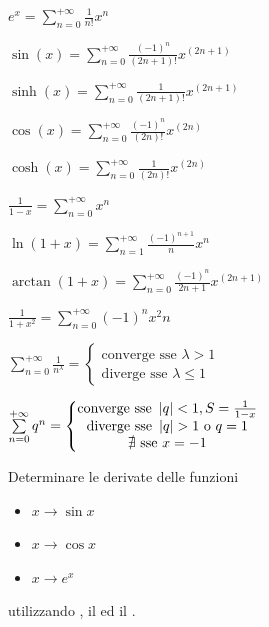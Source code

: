 \begin{example}
	\label{ex:tay_series_examples}
	\begin{description}
		\item $e^x=\sum\limits_{n=0}^{+\infty}\frac{1}{n!}x^n$
		\item $\sin(x)=\sum\limits_{n=0}^{+\infty}\frac{(-1)^n}{(2n+1)!}x^{(2n+1)}$
		\item $\sinh(x)=\sum\limits_{n=0}^{+\infty}\frac{1}{(2n+1)!}x^{(2n+1)}$
		\item $\cos(x)=\sum\limits_{n=0}^{+\infty}\frac{(-1)^n}{(2n)!}x^{(2n)}$
		\item $\cosh(x)=\sum\limits_{n=0}^{+\infty}\frac{1}{(2n)!}x^{(2n)}$
		\item $\frac{1}{1-x}=\sum\limits_{n=0}^{+\infty}x^n$
		\item $\ln(1+x)=\sum\limits_{n=1}^{+\infty}\frac{(-1)^{n+1}}{n}x^n$
		\item $\arctan(1+x)=\sum\limits_{n=0}^{+\infty}\frac{(-1)^{n}}{2n+1}x^{(2n+1)}$
		\item $\frac{1}{1+x^2}=\sum\limits_{n=0}^{+\infty}(-1)^nx^2n$
		\item $\sum\limits_{n=0}^{+\infty}\frac{1}{n^\lambda}=\left\{\begin{matrix}\text{converge sse } \lambda >1\\ \text{diverge sse } \lambda  \leq 1 \end{matrix}\right.$
		\item $\sum\limits_{n=0}^{+\infty}q^n=\left\{\begin{matrix}\text{converge sse } \abs{q}<1, S=\frac{1}{1-x}\\ \text{diverge sse } \abs{q}>1\text{ o }q=1\\\nexists \text{ sse } x=-1 \end{matrix}\right.$
	\end{description}
\end{example}
\begin{exercise}
	\label{ex:deriv_func_with_taylor}
	Determinare le derivate delle funzioni
	\begin{itemize}[noitemsep]
		\item $x \to \sin x$
		\item $x \to \cos x$
		\item $x \to e^x$
	\end{itemize}
	utilizzando , il  ed il .
\end{exercise}

